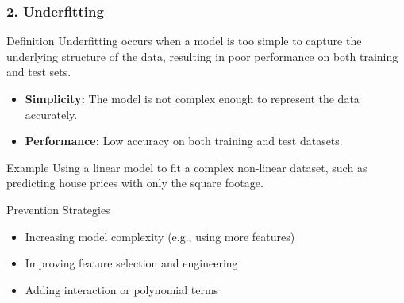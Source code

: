 \documentclass[aspectratio=169]{beamer}
\begin{document}
\begin{frame}[fragile]
  \frametitle{2. Underfitting}

  \begin{block}{Definition}
    Underfitting occurs when a model is too simple to capture the underlying structure of the data, resulting in poor performance on both training and test sets.
  \end{block}

  \begin{itemize}
    \item \textbf{Simplicity:} The model is not complex enough to represent the data accurately.
    \item \textbf{Performance:} Low accuracy on both training and test datasets.
  \end{itemize}

  \begin{block}{Example}
    Using a linear model to fit a complex non-linear dataset, such as predicting house prices with only the square footage.
  \end{block}

  \begin{block}{Prevention Strategies}
    \begin{itemize}
      \item Increasing model complexity (e.g., using more features)
      \item Improving feature selection and engineering
      \item Adding interaction or polynomial terms
    \end{itemize}
  \end{block}

\end{frame}
\end{document}
